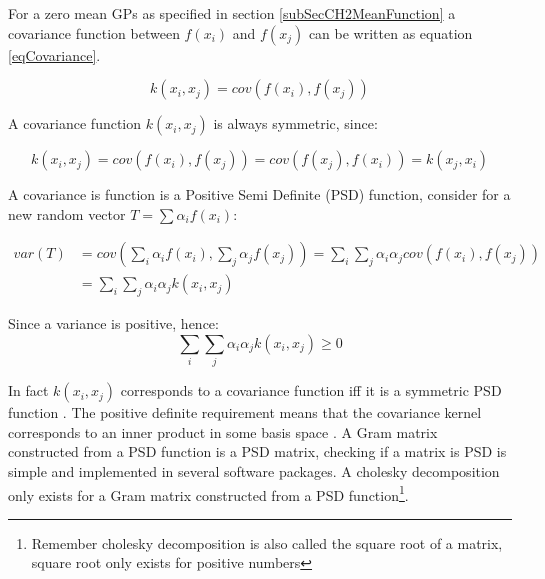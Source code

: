 For a zero mean GPs as specified in section \ref{subSecCH2MeanFunction} a covariance function between \(f(x_{i})\) and \(f(x_{j})\) can be written as equation \ref{eqCovariance}.

\begin{equation}\label{eqCovariance}
    k(x_{i}, x_{j}) = cov(f(x_{i}), f(x_{j}))
\end{equation}

A covariance function \(k(x_{i}, x_{j})\) is always symmetric, since: 

\begin{equation}\label{eqSymmetricCovariance}
    k(x_{i}, x_{j}) = cov(f(x_{i}), f(x_{j})) = cov(f(x_{j}), f(x_{i})) =  k(x_{j}, x_{i})
\end{equation}

A covariance is function is a Positive Semi Definite (PSD) function, consider for a new random vector \(T = \sum \alpha_{i}f(x_{i})\):

\begin{equation}\label{eqDerivePSDCovariance}
    \begin{aligned}
        var(T) & = cov\left ( \sum_{i} \alpha_{i}f(x_{i}), \sum_{j} \alpha_{j}f(x_{j}) \right ) = \sum_{i}\sum_{j}\alpha_{i}\alpha_{j}cov(f(x_{i}), f(x_{j})) \\
& = \sum_{i}\sum_{j}\alpha_{i}\alpha_{j}k(x_{i}, x_{j})
    \end{aligned}
\end{equation}

Since a variance is positive, hence:
\begin{equation}\label{eqPSDCovariance}
\sum_{i}\sum_{j}\alpha_{i}\alpha_{j}k(x_{i}, x_{j}) \geq 0
\end{equation}

In fact \(k(x_{i}, x_{j})\) corresponds to a covariance function iff it is a symmetric PSD function \cite{loeve1978probability, durrande2001etude}. The positive definite requirement means that the covariance kernel corresponds to an inner product in some basis space \cite{bishop2006pattern}. A Gram matrix constructed from a PSD function is a PSD matrix, checking if a matrix is PSD is simple and implemented in several software packages. A cholesky decomposition only exists for a Gram matrix constructed from a PSD function\footnote{Remember cholesky decomposition is also called the square root of a matrix, square root only exists for positive numbers}. 

